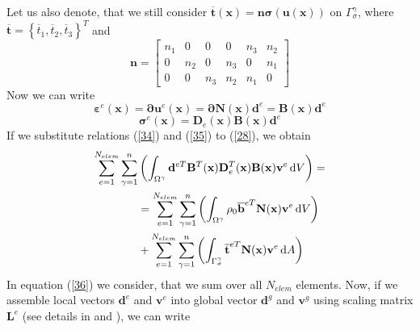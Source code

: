\documentclass{article}
\newcommand{\dd}{\,{\rm d}}
\begin{document}
Let us also denote, that we still consider $\overline{\mathbf{t}}(\mathbf{x})=\mathbf{n} \bm{\sigma}(\mathbf{u}(\mathbf{x}))$ on $\Gamma^{\gamma}_{\sigma}$, where $\overline{\mathbf{t}}=\left\{\overline{t}_{1}, \overline{t}_{2}, \overline{t}_{3}\right\}^{T}$ and 
\begin{equation}\label{33}
\mathbf{n}=\left[\begin{array}{cccccc}{n_{1}} & {0} & {0} & {0} & {n_{3}} & {n_{2}} \\ {0} & {n_{2}} & {0} & {n_{3}} & {0} & {n_{1}} \\ {0} & {0} & {n_{3}} & {n_{2}} & {n_{1}} & {0}\end{array}\right]
\end{equation}
Now we can write 
\begin{equation}\label{34}
\bm{\varepsilon}^{e}(\mathbf{x})=\bm{\partial} \mathbf{u}^{e}(\mathbf{x}) = \bm{\partial} \mathbf{N}(\mathbf{x}) \mathbf{d}^{e}=\mathbf{B}(\mathbf{x}) \mathbf{d}^{e}
\end{equation}
\begin{equation}\label{35}
\bm{\sigma}^{e}(\mathbf{x}) = \mathbf{D}_{e}(\mathbf{x}) \mathbf{B}(\mathbf{x}) \mathbf{d}^{e}
\end{equation}
If we substitute relations (\ref{34}) and (\ref{35}) to (\ref{28}), we obtain
\begin{equation}\label{36}
\begin{aligned} 
\sum^{N_{elem}}_{e = 1}\sum^{n}_{\gamma = 1}&\left(\int_{\Omega^{\gamma}} \mathbf{d}^{eT} \mathbf{B}^{T}(\mathbf{x}) \mathbf{D}_{e}^{T}(\mathbf{x}) \mathbf{B}(\mathbf{x}) \mathbf{v}^{e} \dd V \right)=
\\
&=\sum^{N_{elem}}_{e = 1}\sum^{n}_{\gamma = 1}\left(\int_{\Omega^{\gamma}} \rho_{0}\overline{\mathbf{b}}^{eT} \mathbf{N}(\mathbf{x}) \mathbf{v}^{e} \dd V \right)
\\ 
&+\sum^{N_{elem}}_{e = 1}\sum^{n}_{\gamma = 1}\left(\int_{\Gamma^{\gamma}_{\sigma}} \overline{\mathbf{t}}^{eT} \mathbf{N}(\mathbf{x}) \mathbf{v}^{e} \dd A\right)
\end{aligned}
\end{equation}
In equation (\ref{36}) we consider, that we sum over all $ N_{elem} $ elements. 
Now, if we assemble local vectors $ \mathbf{d}^{e} $ and $ \mathbf{v}^{e} $ into global vector $ \mathbf{d}^{g} $ and $ \mathbf{v}^{g} $ using scaling matrix $ \mathbf{L}^{e} $ (see details in \cite{Zienkiewicz} and \cite{Zienkiewicz2}), we can write
\end{document}
